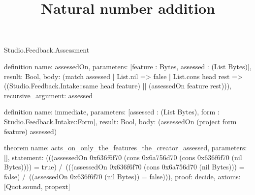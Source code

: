 \begin{lexlean}{Studio.Feedback.Assessment}
\title{Natural number addition}
\begin{semanticmodule}
definition{
  name: assessedOn,
  parameters: [feature : Bytes, assessed : (List Bytes)],
  result: Bool,
  body: (match assessed
    | List.nil => false
    | List.cons head rest => ((Studio.Feedback.Intake::same head feature) || (assessedOn feature rest))),
  recursive_argument: assessed
}

definition{
  name: immediate,
  parameters: [assessed : (List Bytes), form : Studio.Feedback.Intake::Form],
  result: Bool,
  body: (assessedOn (project form feature) assessed)
}

theorem{
  name: acts_on_only_the_features_the_creator_assessed,
  parameters: [],
  statement: (((assessedOn 0x636f6f70 (cons 0x6a756d70 (cons 0x636f6f70 (nil Bytes)))) = true) /\ (((assessedOn 0x636f6f70 (cons 0x6a756d70 (nil Bytes))) = false) /\ ((assessedOn 0x636f6f70 (nil Bytes)) = false))),
  proof: decide{},
  axioms: [Quot.sound, propext]
}
\end{semanticmodule}
\end{lexlean}

